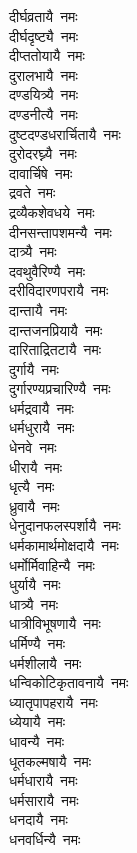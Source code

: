 \begin{multicols}{\maxColumns}
\begin{flushleft}
दीर्घव्रतायै~नमः\\
दीर्घदृष्ट्यै~नमः\\
दीप्ततोयायै~नमः\\
दुरालभायै~नमः\\
दण्डयित्र्यै~नमः\\
दण्डनीत्यै~नमः\\
दुष्टदण्डधरार्चितायै~नमः\\
दुरोदरघ्न्यै~नमः\hfill{}\\
दावार्चिषे~नमः\\
द्रवते~नमः\\
द्रव्यैकशेवधये~नमः\\
दीनसन्तापशमन्यै~नमः\\
दात्र्यै~नमः\\
दवथुवैरिण्यै~नमः\\
दरीविदारणपरायै~नमः\\
दान्तायै~नमः\\
दान्तजनप्रियायै~नमः\\
दारिताद्रितटायै~नमः\hfill{}\\
दुर्गायै~नमः\\
दुर्गारण्यप्रचारिण्यै~नमः\\
धर्मद्रवायै~नमः\\
धर्मधुरायै~नमः\\
धेनवे~नमः\\
धीरायै~नमः\\
धृत्यै~नमः\\
ध्रुवायै~नमः\\
धेनुदानफलस्पर्शायै~नमः\\
धर्मकामार्थमोक्षदायै~नमः\hfill{}\\
धर्मोर्मिवाहिन्यै~नमः\\
धुर्यायै~नमः\\
धात्र्यै~नमः\\
धात्रीविभूषणायै~नमः\\
धर्मिण्यै~नमः\\
धर्मशीलायै~नमः\\
धन्विकोटिकृतावनायै~नमः\\
ध्यातृपापहरायै~नमः\\
ध्येयायै~नमः\\
धावन्यै~नमः\hfill{}\\
धूतकल्मषायै~नमः\\
धर्मधारायै~नमः\\
धर्मसारायै~नमः\\
धनदायै~नमः\\
धनवर्धिन्यै~नमः\\

\end{flushleft}
\end{multicols}
